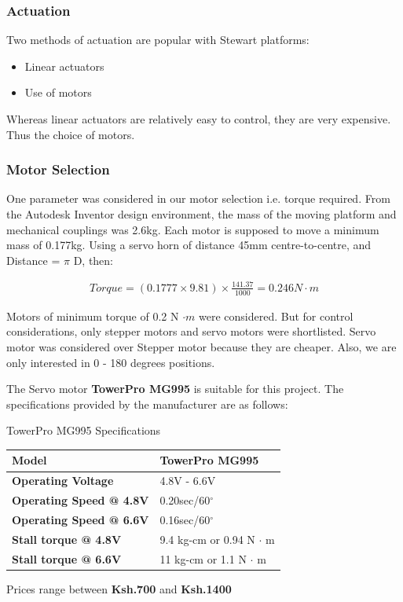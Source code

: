 \subsubsection{Actuation}
Two methods of actuation are popular with Stewart platforms:
\begin{itemize}
	\item Linear actuators
	\item Use of motors
\end{itemize}
Whereas linear actuators are relatively easy to control, they are very expensive. Thus the choice of motors.

\subsubsection*{Motor Selection}
One parameter was considered in our motor selection i.e. torque required. From the Autodesk Inventor design environment, the mass of the moving platform and mechanical couplings was 2.6kg. Each motor is supposed to move a minimum mass of 0.177kg. Using a servo horn of distance 45mm centre-to-centre, and Distance = $ \pi $ D, then:
\begin{ceqn}
	\begin{align}
		Torque = (0.1777 \times 9.81)\times \frac{141.37}{1000} = 0.246 N\cdot m
	\end{align}
\end{ceqn}
Motors of minimum torque of 0.2 N $\cdot m$ were considered. But for control considerations, only stepper motors and servo motors were shortlisted. Servo motor was considered over Stepper motor because they are cheaper. Also, we are only interested in 0 - 180 degrees positions.

The Servo motor \textbf{TowerPro MG995} is suitable for this project. The specifications provided by the manufacturer are as follows:

\begin{table}[!h]
	\caption[Motor Specifications]{TowerPro MG995 Specifications}
\end{table}
\begin{center}
	\begin{tabular}{|l|l|}
		\hline
		\textbf{Model}                  & TowerPro MG995                \\
		\hline
		\textbf{Operating Voltage}      & 4.8V - 6.6V                   \\
		\hline
		\textbf{Operating Speed @ 4.8V} & 0.20sec/60$^{\circ}$          \\
		\hline
		\textbf{Operating Speed @ 6.6V} & 0.16sec/60$^{\circ}$          \\
		\hline
		\textbf{Stall torque @ 4.8V}    & 9.4 kg-cm or 0.94 N $\cdot$ m \\
		\hline
		\textbf{Stall torque @ 6.6V}    & 11 kg-cm or 1.1 N $\cdot$ m   \\
		\hline
	\end{tabular}
\end{center}
Prices range between \textbf{Ksh.700} and \textbf{Ksh.1400}

